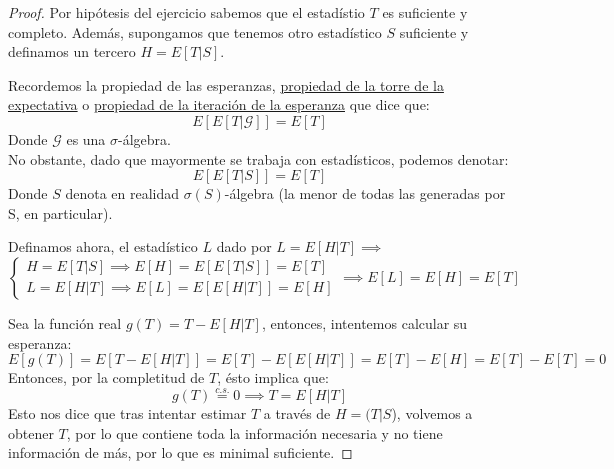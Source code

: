 \begin{proof}
	Por hipótesis del ejercicio sabemos que el estadístio $T$ es suficiente y completo. Además, supongamos que tenemos otro estadístico $S$ suficiente y definamos un tercero $H = E[T|S]$. 
	\begin{observación}
		Recordemos la propiedad de las esperanzas, \underline{propiedad de la torre de la expectativa} o \uline{propiedad de la iteración de la esperanza} que dice que:
		$$E[E[T|\mathcal{G}]] = E[T]$$
		Donde $\mathcal{G}$ es una $\sigma$-álgebra.\\
		No obstante, dado que mayormente se trabaja con estadísticos, podemos denotar: 
		$$E[E[T|S]] = E[T]$$
		Donde $S$ denota en realidad $\sigma(S)$-álgebra (la menor de todas las generadas por S, en particular).
	\end{observación}
	Definamos ahora, el estadístico $L$ dado por $L = E[H|T] \implies$
	$$\begin{cases}
		H = E[T|S] \implies E[H] = E[E[T|S]] = E[T] \\
		L = E[H|T] \implies E[L] = E[E[H|T]] = E[H]
	\end{cases} \implies E[L] = E[H] = E[T]$$

	Sea la función real $g(T) = T - E[H|T]$, entonces, intentemos calcular su esperanza: 
	$$E[g(T)] = E[T - E[H|T]] = E[T] - E[E[H|T]] = E[T] - E[H] = E[T] - E[T] = 0$$
	Entonces, por la completitud de $T$, ésto implica que: 
	$$g(T) \stackrel{c.s.}{=} 0 \implies T = E[H|T]$$
	Esto nos dice que tras intentar estimar $T$ a través de $H = (T|S$), volvemos a obtener $T$, por lo que contiene toda la información necesaria y no tiene información de más, por lo que es minimal suficiente.
\end{proof}

